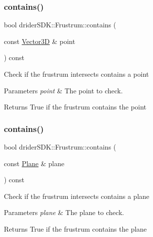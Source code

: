 \subsubsection{\texorpdfstring{contains()}{contains()}\hspace{0.1cm}{\footnotesize\ttfamily [1/5]}}
{\footnotesize\ttfamily bool drider\+S\+D\+K\+::\+Frustrum\+::contains (\begin{DoxyParamCaption}\item[{const \hyperlink{classdrider_s_d_k_1_1_vector3_d}{Vector3D} \&}]{point }\end{DoxyParamCaption}) const}

Check if the frustrum intersects contains a point


\begin{DoxyParams}{Parameters}
{\em point} & The point to check.\\
\hline
\end{DoxyParams}
\begin{DoxyReturn}{Returns}
True if the frustrum contains the point 
\end{DoxyReturn}
\mbox{\label{classdrider_s_d_k_1_1_frustrum_a274ab52ab613e407bbfbba7d33801287}} 
\subsubsection{\texorpdfstring{contains()}{contains()}\hspace{0.1cm}{\footnotesize\ttfamily [2/5]}}
{\footnotesize\ttfamily bool drider\+S\+D\+K\+::\+Frustrum\+::contains (\begin{DoxyParamCaption}\item[{const \hyperlink{classdrider_s_d_k_1_1_plane}{Plane} \&}]{plane }\end{DoxyParamCaption}) const}

Check if the frustrum intersects contains a plane


\begin{DoxyParams}{Parameters}
{\em plane} & The plane to check.\\
\hline
\end{DoxyParams}
\begin{DoxyReturn}{Returns}
True if the frustrum contains the plane 
\end{DoxyReturn}
\mbox{\label{classdrider_s_d_k_1_1_frustrum_a5f13fa643c3a24c64f9419d7de45cffe}} 
